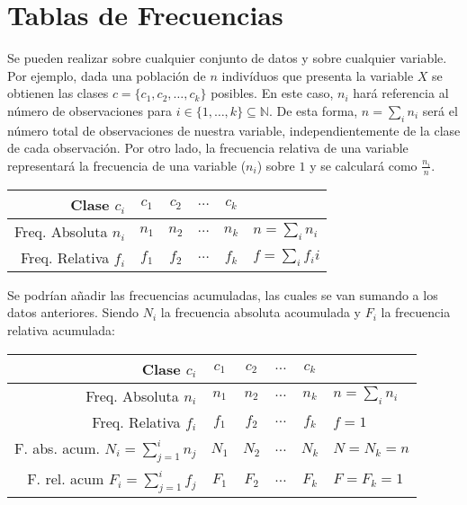 \documentclass[10pt,a4paper]{book}
\begin{document}
\section{Tablas de Frecuencias}
Se pueden realizar sobre cualquier conjunto de datos y sobre cualquier variable. Por ejemplo, dada una población de \(n\) indivíduos que presenta la variable \(X\) se obtienen las clases \(c=\{c_1,c_2,\dots,c_k\}\) posibles. En este caso, \(n_i\) hará referencia al número de observaciones para \(i\in\{1,\dots,k\}\subseteq\mathbb{N}\). De esta forma, \(n = \sum_in_i\) será el número total de observaciones de nuestra variable, independientemente de la clase de cada observación. Por otro lado, la frecuencia relativa de una variable representará la frecuencia de una variable (\(n_i\)) sobre \(1\) y se calculará como $\frac{n_i}{n}$.
\begin{center}
\begin{tabular}{r|c|c|c|c|l}
	Clase \(c_i\) & \(c_1\) & \(c_2\) & $\dots$ & \(c_k\) & \\
	\hline
	Freq. Absoluta \(n_i\) & $n_1$ & $n_2$ & $\dots$ & $n_k$ & $n=\sum_in_i$\\
	\hline
	Freq. Relativa $f_i$ & $f_1$ & $f_2$ & $\dots$ & $f_k$ & $f = \sum_if_ii$\\
\end{tabular}
\end{center}

Se podrían añadir las frecuencias acumuladas, las cuales se van sumando a los datos anteriores. Siendo $N_i$ la frecuencia absoluta acoumulada y $F_i$ la frecuencia relativa acumulada: 
\begin{center}
\begin{tabular}{r|c|c|c|c|l}
	Clase \(c_i\) & \(c_1\) & \(c_2\) & $\dots$ & \(c_k\) & \\
	\hline
	Freq. Absoluta \(n_i\) & $n_1$ & $n_2$ & $\dots$ & $n_k$ & $n=\sum_in_i$\\
	\hline
	Freq. Relativa $f_i$ & $f_1$ & $f_2$ & $\dots$ & $f_k$ & $f = 1$\\
	\hline
	F. abs. acum. $N_i= \sum\limits_{j=1}^in_j$ & $N_1$ & $N_2$ & $\dots$ & $N_k$ & $N = N_k = n$\\
	\hline
	F. rel. acum $F_i= \sum\limits_{j=1}^if_j$ & $F_1$ & $F_2$ & $\dots$ & $F_k$ & $F = F_k = 1$\\

\end{tabular}
\end{center}
\end{document}
